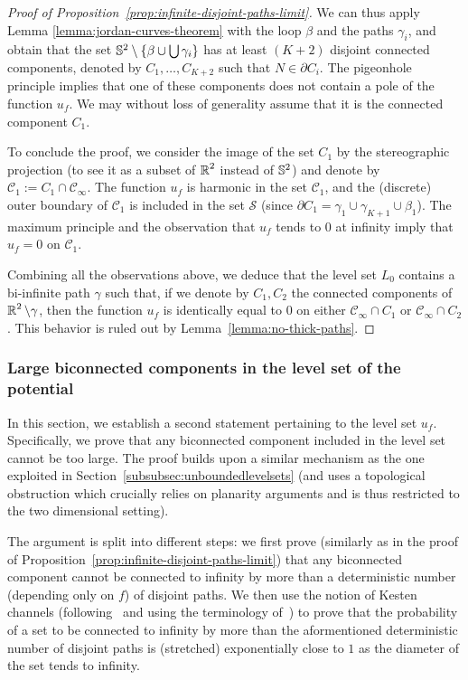 \documentclass[12pt]{amsart}
\numberwithin{equation}{section}
\begin{document}
\begin{proof}[Proof of Proposition~\ref{prop:infinite-disjoint-paths-limit}]
		We can thus apply Lemma \ref{lemma:jordan-curves-theorem} with the loop $\beta$ and the paths $\gamma_i$, and obtain that the set $\S^2 \setminus \{\beta \cup \bigcup \gamma_i\}$ has at least $(K+2)$ disjoint connected components, denoted by $C_1 , \ldots, C_{K+2}$ such that $N \in \partial C_i$. The pigeonhole principle implies that one of these components does not contain a pole of the function $u_f$. We may without loss of generality assume that it is the connected component $C_1$. 
		
		
		To conclude the proof, we consider the image of the set $C_1$ by the stereographic projection (to see it as a subset of $\R^2$ instead of $\S^2$) and denote by $\mathcal{C}_1 := C_1 \cap \mathscr{C}_\infty$. The function $u_f$ is harmonic in the set $\mathcal{C}_1$, and the (discrete) outer boundary of $\mathcal{C}_1$ is included in the set $\mathcal{S}$ (since $\partial C_1 = \gamma_1 \cup \gamma_{K+1} \cup \beta_1$). The maximum principle and the observation that $u_f$ tends to $0$ at infinity imply that $u_f = 0$ on $\mathcal{C}_1$. 
		
		Combining all the observations above, we deduce that the level set $L_0$ contains a bi-infinite path $\gamma$ such that, if we denote by $C_1 , C_2$ the connected components of $\R^2 \setminus \gamma$, then the function $u_f$ is identically equal to $0$ on either $\mathscr{C}_\infty \cap C_1$ or $\mathscr{C}_\infty \cap C_2$. This behavior is ruled out by Lemma~\ref{lemma:no-thick-paths}.
	\end{proof}
	
	
	\subsubsection{Large biconnected components in the level set of the potential}
	\label{subsubsec:large-biconnected-components}
	
	In this section, we establish a second statement pertaining to the level set $u_f$. Specifically, we prove that any biconnected component included in the level set cannot be too large. The proof builds upon a similar mechanism as the one exploited in Section~\ref{subsubsec:unboundedlevelsets} (and uses a topological obstruction which crucially relies on planarity arguments and is thus restricted to the two dimensional setting).
	
	The argument is split into different steps: we first prove (similarly as in the proof of Proposition~\ref{prop:infinite-disjoint-paths-limit}) that any biconnected component cannot be connected to infinity by more than a deterministic number (depending only on $f$) of disjoint paths. We then use the notion of Kesten channels (following~\cite[Theorem 11.1]{kesten-book} and using the terminology of~\cite{isoperimetry-mathieu-remy}) to prove that the probability of a set to be connected to infinity by more than the aformentioned deterministic number of disjoint paths is (stretched) exponentially close to $1$ as the diameter of the set tends to infinity.
	
\end{document}
